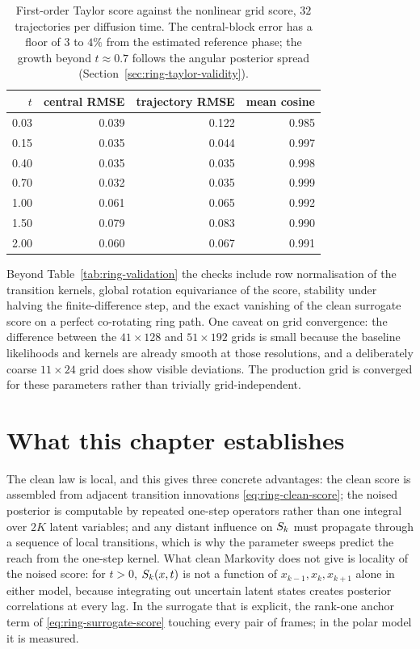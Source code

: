 \begin{table}[t]\centering
\caption{First-order Taylor score against the nonlinear grid score, $32$
trajectories per diffusion time. The central-block error has a floor of $3$ to
$4\%$ from the estimated reference phase; the growth beyond $t \approx 0.7$
follows the angular posterior spread (Section~\ref{sec:ring-taylor-validity}).}
\label{tab:ring-taylor}
\begin{tabular}{@{}rrrr@{}}
\toprule
$t$ & central RMSE & trajectory RMSE & mean cosine \\
\midrule
0.03 & 0.039 & 0.122 & 0.985 \\
0.15 & 0.035 & 0.044 & 0.997 \\
0.40 & 0.035 & 0.035 & 0.998 \\
0.70 & 0.032 & 0.035 & 0.999 \\
1.00 & 0.061 & 0.065 & 0.992 \\
1.50 & 0.079 & 0.083 & 0.990 \\
2.00 & 0.060 & 0.067 & 0.991 \\
\bottomrule
\end{tabular}
\end{table}

Beyond Table~\ref{tab:ring-validation} the checks include row normalisation of
the transition kernels, global rotation equivariance of the score, stability
under halving the finite-difference step, and the exact vanishing of the clean
surrogate score on a perfect co-rotating ring path. One caveat on grid
convergence: the difference between the $41\times128$ and $51\times192$ grids
is small because the baseline likelihoods and kernels are already smooth at
those resolutions, and a deliberately coarse $11\times24$ grid does show
visible deviations. The production grid is converged for these parameters
rather than trivially grid-independent.

\section{What this chapter establishes}\label{sec:ring-answers}

The clean law is local, and this gives three concrete advantages: the clean
score is assembled from adjacent transition innovations
\eqref{eq:ring-clean-score}; the noised posterior is computable by repeated
one-step operators rather than one integral over $2K$ latent variables; and any
distant influence on $S_k$ must propagate through a sequence of local
transitions, which is why the parameter sweeps predict the reach from the
one-step kernel. What clean Markovity does not give is locality of the noised
score: for $t > 0$, $S_k(x,t)$ is not a function of
$x_{k-1}, x_k, x_{k+1}$ alone in either model, because integrating out
uncertain latent states creates posterior correlations at every lag. In the
surrogate that is explicit, the rank-one anchor term of
\eqref{eq:ring-surrogate-score} touching every pair of frames; in the polar
model it is measured.

